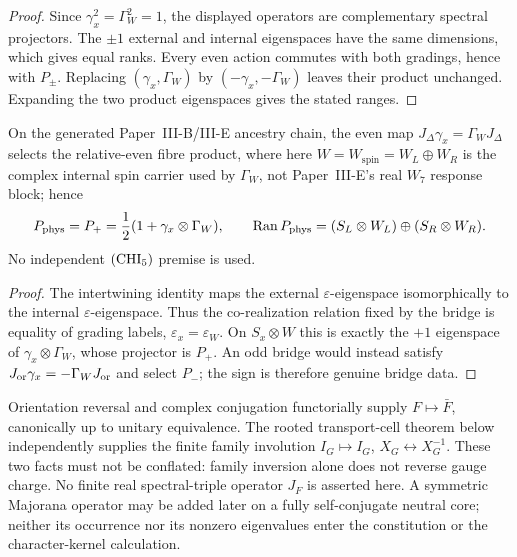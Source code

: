 \documentclass[12pt,a4paper]{article}
\begin{document}
\begin{proof}
Since \(\gamma_x^2=\Gamma_W^2=1\), the displayed operators are complementary
spectral projectors.  The \(\pm1\) external and internal eigenspaces have the
same dimensions, which gives equal ranks.  Every even action commutes with
both gradings, hence with \(P_\pm\).  Replacing
\((\gamma_x,\Gamma_W)\) by \((-\gamma_x,-\Gamma_W)\) leaves their product
unchanged.  Expanding the two product eigenspaces gives the stated ranges.
\end{proof}

\begin{corollary}
\label{p5:cor:chi5-visible-chirality}
On the generated Paper~III-B/III-E ancestry chain, the even map
\(J_\Delta\gamma_x=\Gamma_WJ_\Delta\) selects the relative-even fibre product,
where here $W=W_{\mathrm{spin}}=W_L\oplus W_R$ is the complex internal
spin carrier used by $\Gamma_W$, not Paper~III-E's real $W_7$ response block;
hence
\[
P_{\rm phys}=P_+
=\frac12(1+\gamma_x\otimes\Gamma_W),
\qquad
\operatorname{Ran}P_{\rm phys}
=(S_L\otimes W_L)\oplus(S_R\otimes W_R).
\]
No independent \(( {\rm CHI}_5 )\) premise is used.
\end{corollary}

\begin{proof}
The intertwining identity maps the external \(\varepsilon\)-eigenspace
isomorphically to the internal \(\varepsilon\)-eigenspace.  Thus the
co-realization relation fixed by the bridge is equality of grading labels,
\(\varepsilon_x=\varepsilon_W\).  On \(S_x\otimes W\) this is exactly the
\(+1\) eigenspace of \(\gamma_x\otimes\Gamma_W\), whose projector is \(P_+\).
An odd bridge would instead satisfy
\(J_{\rm or}\gamma_x=-\Gamma_WJ_{\rm or}\) and select \(P_-\); the sign is
therefore genuine bridge data.
\end{proof}

\begin{corollary}
\label{p5:cor:functorial-conjugate-completion}
Orientation reversal and complex conjugation functorially supply
\(F\mapsto\bar F\), canonically up to unitary equivalence.  The rooted
transport-cell theorem below independently supplies the finite family
involution \(I_G\mapsto I_G\), \(X_G\leftrightarrow X_G^{-1}\).  These two
facts must not be conflated: family inversion alone does not reverse gauge
charge.  No finite real spectral-triple operator \(J_F\) is asserted here.
A symmetric Majorana operator may be added later on a fully self-conjugate
neutral core; neither its occurrence nor its nonzero eigenvalues enter the
constitution or the character-kernel calculation.
\end{corollary}
\end{document}
